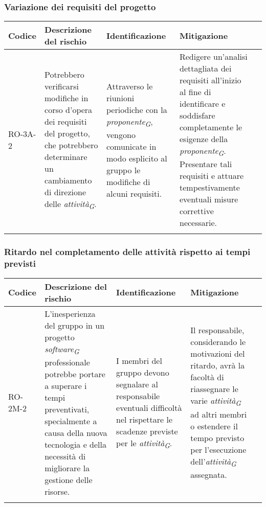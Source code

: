 \subsubsection{Variazione dei requisiti del progetto}
\begin{table}[H]
    \centering
    \begin{tabularx}{\textwidth}{l>{\RaggedRight}X>{\RaggedRight}X>{\RaggedRight}X>{\RaggedRight}X}
    \toprule
    \rowcolor{gray!50}
    \textbf{Codice} & \textbf{Descrizione del rischio} & \textbf{Identificazione} & \textbf{Mitigazione} \\
    \midrule
    \addlinespace 
    RO-3A-2 & 
    Potrebbero verificarsi modifiche in corso d'opera dei requisiti del progetto, che potrebbero determinare un cambiamento di direzione delle \textit{attività}\textsubscript{\textit{G}}. &
    Attraverso le riunioni periodiche con la \textit{proponente}\textsubscript{\textit{G}}, vengono comunicate in modo esplicito al gruppo le modifiche di alcuni requisiti. &
    Redigere un'analisi dettagliata dei requisiti all'inizio al fine di identificare e soddisfare completamente le esigenze della \textit{proponente}\textsubscript{\textit{G}}. Presentare tali requisiti e attuare tempestivamente eventuali misure correttive necessarie.\\
    \bottomrule
    \addlinespace 
    \end{tabularx}
\end{table}

\vspace{2cm}

\subsubsection{Ritardo nel completamento delle attività rispetto ai tempi previsti} \label{sec:ritAttivita}
\begin{table}[H]
    \centering
    \begin{tabularx}{\textwidth}{l>{\RaggedRight}X>{\RaggedRight}X>{\RaggedRight}X>{\RaggedRight}X}
    \toprule
    \rowcolor{gray!50}
    \textbf{Codice} & \textbf{Descrizione del rischio} & \textbf{Identificazione} & \textbf{Mitigazione}\\
    \midrule
    \addlinespace 
    RO-2M-2 & 
    L'inesperienza del gruppo in un progetto \textit{software}\textsubscript{\textit{G}} professionale potrebbe portare a superare i tempi preventivati, specialmente a causa della nuova tecnologia e della necessità di migliorare la gestione delle risorse.& 
    I membri del gruppo devono segnalare al responsabile eventuali difficoltà nel rispettare le scadenze previste per le \textit{attività}\textsubscript{\textit{G}}.&
    Il responsabile, considerando le motivazioni del ritardo, avrà la facoltà di riassegnare le varie \textit{attività}\textsubscript{\textit{G}} ad altri membri o estendere il tempo previsto per l'esecuzione dell'\textit{attività}\textsubscript{\textit{G}} assegnata.\\
    \bottomrule
    \addlinespace 
    \end{tabularx}
\end{table}

